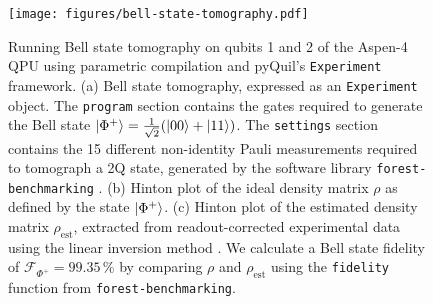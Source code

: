 \documentclass[12pt]{iopart}
\begin{document}
\begin{figure}
    \centering
    \texttt{[image: figures/bell-state-tomography.pdf]}
    \caption{
    Running Bell state tomography on qubits 1 and 2 of the Aspen-4 QPU using parametric compilation and pyQuil's \texttt{Experiment} framework. (a) Bell state tomography, expressed as an \texttt{Experiment} object. The \texttt{program} section contains the gates required to generate the Bell state $\ket{\Phi^+} = \frac{1}{\sqrt{2}}(\ket{00} + \ket{11})$. The \texttt{settings} section contains the 15 different non-identity Pauli measurements required to tomograph a 2Q state, generated by the software library \texttt{forest-benchmarking} \cite{ForestBenchmarking}. (b) Hinton plot \cite{Matplotlib, SciPy} of the ideal density matrix $\rho$ as defined by the state $\ket{\Phi^+}$. (c) Hinton plot of the estimated density matrix $\rho_{\textrm{est}}$, extracted from readout-corrected experimental data using the linear inversion method \cite{WoodThesis}. We calculate a Bell state fidelity of $\mathcal{F}_{\Phi^+} = 99.35\,\%$ by comparing $\rho$ and $\rho_{\textrm{est}}$ using the \texttt{fidelity} function from \texttt{forest-benchmarking}.}
    \label{fig:Tomography}
\end{figure}
\end{document}
